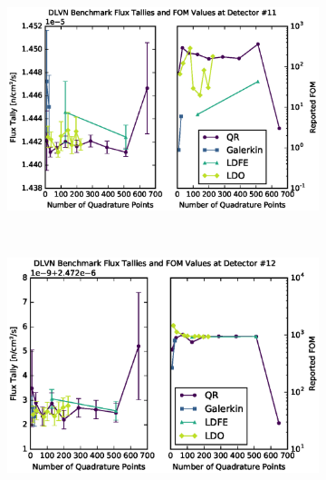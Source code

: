 \documentclass{article} %
\begin{document}
\begin{figure}[!htb]
\ContinuedFloat
\begin{subfigure}{\linewidth}
\centering
\includegraphics[max height=0.445\textheight]
{dlvn-fwcadis-11.eps}
\label{dlvn-fwc-11}
\end{subfigure}
\\
\begin{subfigure}{\linewidth}
\centering
\includegraphics[max height=0.445\textheight]
{dlvn-fwcadis-12.eps}
\label{dlvn-fwc-12}
\end{subfigure}
\end{figure}
\clearpage
\end{document}
